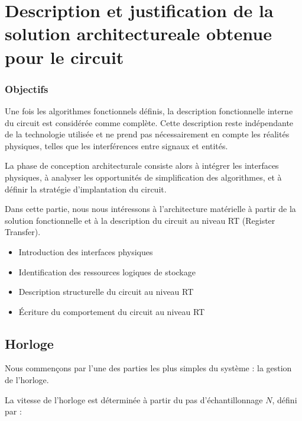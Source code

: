 \section{Description et justification de la solution architectureale obtenue pour le circuit}

\subsubsection*{Objectifs}

Une fois les algorithmes fonctionnels définis, la description fonctionnelle interne du circuit 
est considérée comme complète. Cette description reste indépendante de la technologie utilisée 
et ne prend pas nécessairement en compte les réalités physiques, telles que les interférences 
entre signaux et entités.
\newline

La phase de conception architecturale consiste alors à intégrer les interfaces physiques, à analyser 
les opportunités de simplification des algorithmes, et à définir la stratégie d'implantation du 
circuit.
\newline

Dans cette partie, nous nous intéressons à l'architecture matérielle à partir de la solution 
fonctionnelle et à la description du circuit au niveau RT (Register Transfer).  
\newline

\begin{itemize}
    \item Introduction des interfaces physiques
    \item Identification des ressources logiques de stockage
    \item Description structurelle du circuit au niveau RT
    \item Écriture du comportement du circuit au niveau RT
\end{itemize}

\vspace{20px}

\subsection{Horloge}

Nous commençons par l'une des parties les plus simples du système : la gestion de l'horloge.

La vitesse de l'horloge est déterminée à partir du pas d'échantillonnage \(N\), défini par :

